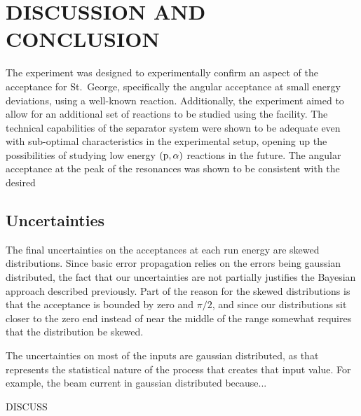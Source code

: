 \chapter{DISCUSSION AND CONCLUSION}
\label{ch:discussion-and-conclusion}

The experiment was designed to experimentally confirm an aspect of the
acceptance for St.\ George, specifically the angular acceptance at small
energy deviations, using a well-known reaction. Additionally, the
experiment aimed to allow for an additional set of reactions to be
studied using the facility. The technical capabilities of the separator
system were shown to be adequate even with sub-optimal characteristics
in the experimental setup, opening up the possibilities of studying low
energy $(\rm{p},\alpha)$ reactions in the future. The angular acceptance at the
peak of the resonances was shown to be consistent with the desired


\section{Uncertainties}
\label{sec:uncertainties}

The final uncertainties on the acceptances at each run energy are skewed
distributions. Since basic error propagation relies on the errors being
gaussian distributed, the fact that our uncertainties are not partially
justifies the Bayesian approach described previously. Part of the reason
for the skewed distributions is that the acceptance is bounded by zero
and $\pi/2$, and since our distributions sit closer to the zero end instead
of near the middle of the range somewhat requires that the distribution
be skewed.

The uncertainties on most of the inputs are gaussian distributed, as
that represents the statistical nature of the process that creates that
input value. For example, the beam current in gaussian distributed
because...

DISCUSS

